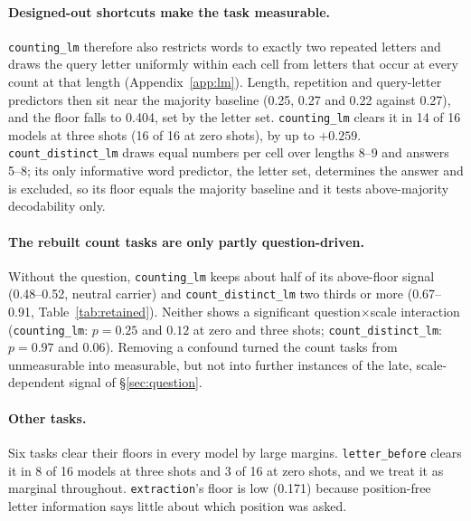 \paragraph{Designed-out shortcuts make the task measurable.}
\texttt{counting\_lm} therefore also restricts words to exactly two repeated letters and draws the
query letter uniformly within each cell from letters that occur at every count at that length
(Appendix~\ref{app:lm}). Length, repetition and query-letter predictors then sit near the majority
baseline (0.25, 0.27 and 0.22 against 0.27), and the floor falls to 0.404, set by the letter set.
\texttt{counting\_lm} clears it in 14 of 16 models at three shots (16 of 16 at zero shots), by up to
$+0.259$. \texttt{count\_distinct\_lm} draws equal numbers per cell over lengths 8--9 and answers 5--8;
its only informative word predictor, the letter set, determines the answer and is excluded, so its
floor equals the majority baseline and it tests above-majority decodability only.

\paragraph{The rebuilt count tasks are only partly question-driven.}
Without the question, \texttt{counting\_lm} keeps about half of its above-floor signal (0.48--0.52,
neutral carrier) and \texttt{count\_distinct\_lm} two thirds or more (0.67--0.91,
Table~\ref{tab:retained}). Neither shows a significant question$\times$scale interaction
(\texttt{counting\_lm}: $p = 0.25$ and $0.12$ at zero and three shots; \texttt{count\_distinct\_lm}:
$p = 0.97$ and $0.06$). Removing a confound turned the count tasks from unmeasurable into measurable,
but not into further instances of the late, scale-dependent signal of \S\ref{sec:question}.

\paragraph{Other tasks.}
Six tasks clear their floors in every model by large margins. \texttt{letter\_before} clears it in 8 of
16 models at three shots and 3 of 16 at zero shots, and we treat it as marginal throughout.
\texttt{extraction}'s floor is low (0.171) because position-free letter information says little about
which position was asked.
